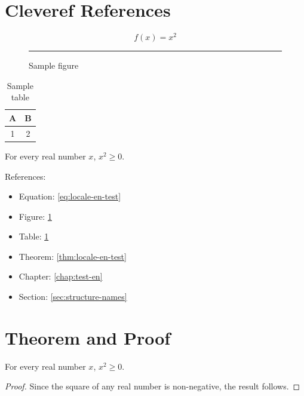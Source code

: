 \begin{latin}
\section{Cleveref References}
\label{sec:cleveref-names}

\begin{equation}
    \label{eq:locale-en-test}
    f(x) = x^2
\end{equation}

\begin{figure}[h]
\centering
\rule{3cm}{2cm}
\caption{Sample figure}
\label{fig:locale-en-test}
\end{figure}

\begin{table}[h]
\centering
\caption{Sample table}
\label{tab:locale-en-test}
\begin{tabular}{cc}
\toprule
A & B \\
\midrule
1 & 2 \\
\bottomrule
\end{tabular}
\end{table}

\begin{theorem}
    For every real number $x$, $x^2 \geq 0$.
\end{theorem}
\label{thm:locale-en-test}

References:

\begin{itemize}
    \item Equation: \cref{eq:locale-en-test}
    \item Figure: \cref{fig:locale-en-test}
    \item Table: \cref{tab:locale-en-test}
    \item Theorem: \cref{thm:locale-en-test}
    \item Chapter: \cref{chap:test-en}
    \item Section: \cref{sec:structure-names}
\end{itemize}

\section{Theorem and Proof}
\label{sec:theorem-proof}

\begin{theorem}
    For every real number $x$, $x^2 \geq 0$.
\end{theorem}

\begin{proof}
    Since the square of any real number is non-negative, the result follows.
\end{proof}


\end{latin}
